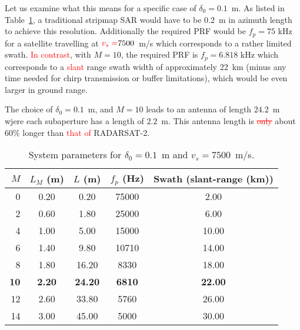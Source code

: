 \documentclass[journal]{IEEEtran}
\newcommand{\antennaLength}{\ensuremath{L}}
\newcommand{\antennaLengthEffective}{\ensuremath{L_M}}
\newcommand{\satv}{\ensuremath{v_s}}
\newcommand{\prf}{\ensuremath{f_p}}
\newcommand{\prfEffective}{\ensuremath{\prf}}
\newcommand{\resxDesired}{\ensuremath{\delta_0}}
\newcommand{\cg}[1]{\textcolor{red}{#1}}
\newcommand{\cgs}[1]{\textcolor{red}{\sout{#1}}}
\begin{document}
Let us examine what this means for a specific case of $\resxDesired = 0.1$~m. As listed in Table~\ref{tb:Simulation}, a traditional stripmap SAR would have to be $0.2$~m in azimuth length to achieve this resolution. Additionally the required PRF would be $\prf = 75$ kHz for a satellite travelling at $\cg{\satv=}7500$~m/s which corresponds to a rather limited swath. \cg{In contrast}, with $M=10$, the required PRF is $\prfEffective = 6.818$ kHz which corresponds to a \cg{slant} range swath width of approximately 22~km (minus any time needed for chirp transmission or buffer limitations), which would be even larger in ground range.
\par
The choice of $\resxDesired=0.1$~m, and $M=10$ leads to an antenna of length $24.2$~m wjere each subaperture has a length of $2.2$~m. This antenna length is \cgs{only} about $60$\% longer than \cg{that of} RADARSAT-2.
\begin{table}[h!]
\begin{center}
\caption{System parameters for $\resxDesired=0.1$~m and $\satv=7500$~m/s.}
\label{tb:Simulation}
 \begin{tabular}{r|c|c|c|c}\\\hline
  {\bf $M$} & {\bf $\antennaLengthEffective$ (m)} & {\bf $\antennaLength$ (m)} & {\bf $\prfEffective$ (Hz)} & {\bf Swath (slant-range (km))}\\\hline 
0 & 0.20 & 0.20 & 75000 & 2.00\\\hline
2 & 0.60 & 1.80 & 25000 & 6.00\\\hline
4 & 1.00 & 5.00 & 15000 & 10.00\\\hline
6 & 1.40 & 9.80 & 10710 & 14.00\\\hline
8 & 1.80 & 16.20 & 8330 & 18.00\\\hline
{\bf 10} & {\bf 2.20} & {\bf 24.20} & {\bf 6810} & {\bf 22.00}\\\hline
12 & 2.60 & 33.80 & 5760 & 26.00\\\hline
14 & 3.00 & 45.00 & 5000 & 30.00\\\hline
 \end{tabular}
 \end{center}
\end{table}

\end{document}
